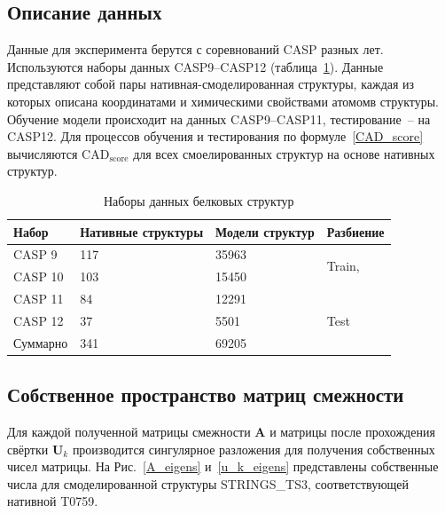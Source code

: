 \documentclass[14pt]{extarticle}
\begin{document}
\subsection{Описание данных}
Данные для эксперимента берутся с соревнований CASP разных лет. Используются наборы данных CASP9--CASP12 (таблица~\ref{table:student}). Данные представляют собой пары нативная-смоделированная структуры, каждая из которых описана координатами и химическими свойствами атомомв структуры. Обучение модели происходит на данных CASP9--CASP11, тестирование~-- на CASP12. Для процессов обучения и тестирования по формуле~\eqref{CAD_score} вычисляются $\text{CAD}_\text{score}$ для всех смоелированных структур на основе нативных структур. 

\begin{table}[H]
		\centering
		\caption{Наборы данных белковых структур}
		\begin{tabular}{p{28mm}|p{26mm}p{26mm}|p{28mm}}
		\hline Набор & Нативные структуры & Модели структур& Разбиение\\
		\hline 
		CASP 9 & 117 & 35963 &  \multirow{2}{*}{Train,} \\
		CASP 10 & 103 & 15450 & \multirow{2}{*}{Validation} \\
		CASP 11 & 84 & 12291 &  \\
		\hline 
		CASP 12 & 37 & 5501 & {Test} \\
		\hline
		Суммарно & 341 & 69205 &
		\end{tabular}
		\label{table:student}
\end{table}


\subsection{Собственное пространство матриц смежности}

Для каждой полученной матрицы смежности $\textbf{A}$ и матрицы после прохождения свёртки $\textbf{U}_k$ производится сингулярное разложения для получения собственных чисел матрицы. На Рис.~\ref{A_eigens} и~\ref{u_k_eigens} представлены собственные числа для смоделированной структуры STRINGS\_TS3, соответствующей нативной T0759.
\end{document}
